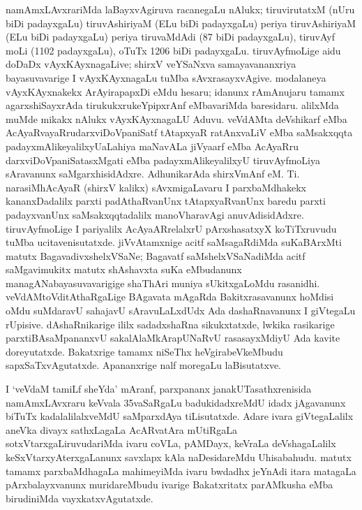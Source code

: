 namAmxLAvxrariMda laBayxvAgiruva racanegaLu nAlukx; tiruvirutatxM (nUru biDi padayx\-gaLu) tiruvAshiriyaM (ELu biDi padayxgaLu) periya tiruvAshiriyaM (ELu biDi padayx\-gaLu) periya tiruvaMdAdi (87 biDi padayxgaLu), tiruvAyf moLi (1102 padayx\-gaLu), oTuTx 1206 biDi padayxgaLu. tiruvAyfmoLige aidu doDaDx vAyxKAyxna\-gaLive; shirxV veYSaNxva samayavananxriya bayasuvavarige I vAyxKAyxnagaLu tuMba sAvxrasayx\-vAgive. modalaneya vAyxKAyxnakekx ArAyirapapxDi eMdu hesaru; idanunx rAmAnu\-jaru tamamx agarxshiSayxrAda tirukukxrukeYpipxrAnf eMbavariMda baresidaru. alilxMda muMde mikakx nAlukx vAyxKAyxnagaLU Aduvu. veVdAMta deVshikarf eMba AcAyaRvayaRru\break darxviDoVpaniSatf tAtapxyaR ratAnxvaLiV eMba saMsakxqqta padayxmAlikeyalilxyU\break aLahiya maNavALa jiVyaarf eMba AcAyaRru darxviDoVpaniSatasxMgati eMba padayx\-mAlikeyalilxyU tiruvAyfmoLiya sAravanunx saMgarxhisidAdxre. AdhunikarAda shirxVmAnf eM. Ti. narasiMhAcAyaR (shirxV kalikx) sAvxmigaLavaru I parxbaMdhakekx kananxDadalilx parxti padAthaRvanUnx tAtapxyaRvanUnx baredu parxti padayxvanUnx saMsakxqqtadalilx manoVhara\-vAgi anuvAdisidAdxre. tiruvAyfmoLige I pariyalilx AcAyaARrelalxrU pArxshasatxyX koTiTxruvudu tuMba ucitavenisutatxde. jiVvAtamxnige acitf saMsagaRdiMda suKaBArxMti matutx BagavadivxshelxVSaNe; Bagavatf saMshelxVSaNadiMda acitf saMgavimukitx matutx shAshavxta suKa eMbudanunx managANabayasuvavarigige shaThAri muniya sUkitxgaLoMdu rasanidhi. veVdAMtoVditAthaRgaLige BAgavata mAgaRda Bakitxrasavanunx hoMdisi oMdu suMdaravU sahajavU sAravuLaLxdUdx Ada dashaRnavanunx I giVtegaLu rUpisive. dAshaRnikarige ililx sadadxshaRna sikukxtatxde, lwkika rasikarige parxtiBAsaMpananxvU sakalAlaMkArapUNaRvU rasasayxMdiyU Ada kavite doreyutatxde. Bakatxrige tamamx niSeThx heVgirabeVkeMbudu sapxSaTxvAgutatxde. Apananxrige nalf moregaLu laBisutatxve.

I `veVdaM tamiLf sheYda' mAranf, parxpananx janakUTasathxrenisida namAmxLAvxraru keVvala 35vaSaRgaLu badukidadxreMdU idadx jAgavanunx biTuTx kadalalilalxveMdU saMparxdAya
tiLisutatxde. Adare ivara giVtegaLalilx aneVka divayx sathxLagaLa AcARvatAra mUtiRgaLa sotxVtarxgaLiruvudariMda ivaru coVLa, pAMDayx, keVraLa deVshagaLalilx keSxVtarxyAterxgaLanunx savxlapx kAla naDesidareMdu Uhisabahudu. matutx tamamx parxbaMdhagaLa mahimeyiMda ivaru bwdadhx jeYnAdi itara matagaLa pArxbalayxvanunx muridareMbudu ivarige Bakatxritatx parAMkusha eMba birudiniMda vayxkatxvAgutatxde.

